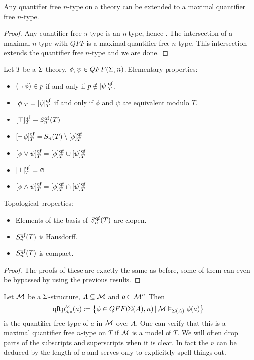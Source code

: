 \begin{prop}
    Any quantifier free $n$-type on a theory 
    can be extended to a maximal quantifier free 
    $n$-type.
\end{prop}
\begin{proof}
    Any quantifier free $n$-type is an $n$-type, 
    hence .
    The intersection of a maximal $n$-type with $QFF$ is a maximal 
    quantifier free $n$-type. 
    This intersection extends the quantifier free $n$-type and we are done.
\end{proof}

\begin{prop}
    Let $T$ be a $\Sigma$-theory, $\phi, \psi \in QFF(\Sigma,n)$.
    Elementary properties:
    \begin{itemize}
        \item $(\neg\, \phi) \in p$ if and only if $p \notin [\psi]_T^{\operatorname{qf}}$.
        \item $[\phi]_T = [\psi]_T^{\operatorname{qf}}$ if and only if $\phi$ and $\psi$ are 
            equivalent modulo $T$.
        \item $[\top]_T^{\operatorname{qf}} = S_n^{\operatorname{qf}}(T)$
        \item $[\neg\, \phi]_T^{\operatorname{qf}} = S_n(T) \setminus [\phi]_T^{\operatorname{qf}}$
        \item $[\phi \lor \psi]_T^{\operatorname{qf}} = [\phi]_T^{\operatorname{qf}} \cup [\psi]_T^{\operatorname{qf}}$
        \item $[\bot]_T^{\operatorname{qf}} = \varnothing$
        \item $[\phi \land \psi]_T^{\operatorname{qf}} = [\phi]_T^{\operatorname{qf}} \cap [\psi]_T^{\operatorname{qf}}$
    \end{itemize}
    Topological properties:
    \begin{itemize}
        \item Elements of the basis of $S_n^{\operatorname{qf}}(T)$ are clopen.
        \item $S_n^{\operatorname{qf}}(T)$ is Hausdorff.
        \item $S_n^{\operatorname{qf}}(T)$ is compact.
    \end{itemize}
\end{prop}
\begin{proof}
    The proofs of these are exactly the same as before, 
    some of them can even be bypassed by using the previous results.
\end{proof}

\begin{dfn}
    Let $\mathcal{M}$ be a $\Sigma$-structure, 
    $A \subseteq {\mathcal{M}}$ and $a \in {\mathcal{M}}^n$
    Then 
    \[\subintp{A,n}{\MM}{\qftp}(a) := 
    \set{\phi \in QFF(\Si(A),n) \st \MM \model{\Si(A)} \phi(a)}\]
    is the quantifier free type of $a$ in $\mathcal{M}$ over $A$.
    One can verify that this is a maximal quantifier free $n$-type on $T$
    if $\mathcal{M}$ is a model of $T$.
    We will often drop parts of the subscripts and superscripts when it is
    clear. 
    In fact the $n$ can be deduced by the length of $a$ 
    and serves only to explicitely spell things out.
\end{dfn}